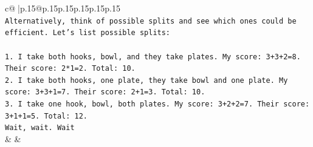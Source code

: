 \documentclass{article}
\begin{document}
{\begin{supertabular}{c@{$\;$}|p{.15\linewidth}@{}p{.15\linewidth}p{.15\linewidth}p{.15\linewidth}p{.15\linewidth}p{.15\linewidth}}
{{{\\ 
\texttt{Alternatively, think of possible splits and see which ones could be efficient. Let's list possible splits:} \\
\\ 
\texttt{1. I take both hooks, bowl, and they take plates. My score: 3+3+2=8. Their score: 2*1=2. Total: 10.} \\
\texttt{2. I take both hooks, one plate, they take bowl and one plate. My score: 3+3+1=7. Their score: 2+1=3. Total: 10.} \\
\texttt{3. I take one hook, bowl, both plates. My score: 3+2+2=7. Their score: 3+1+1=5. Total: 12.} \\
\texttt{Wait, wait. Wait} \\
            }
        }
    }
    & & \\ \\


\end{supertabular}}
\end{document}
